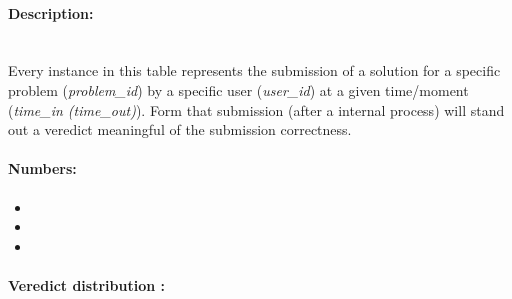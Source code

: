 \documentclass[../main.tex]{subfiles}
\begin{document}
\begin{figure}
  \vspace{-20pt}
  \begin{center}
  \end{center}
  \vspace{-20pt}
\end{figure}

\paragraph{Description:}~\\ %
Every instance in this table represents the submission of a solution for a specific problem (\emph{problem\_id}) by a specific user (\emph{user\_id}) at a given time/moment (\emph{time\_in (time\_out)}). Form that submission (after a internal process) will stand out a veredict meaningful of the submission correctness.

\paragraph{Numbers:}%
\begin{itemize}
	\item 
	\item 
	\item 
\end{itemize}


\paragraph{Veredict distribution :} %
\end{document}
